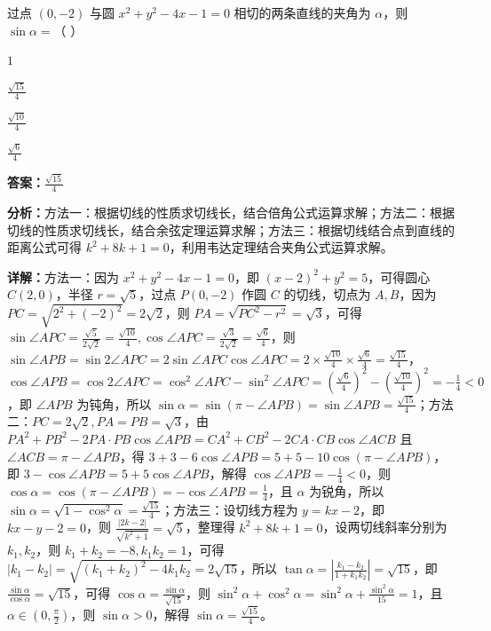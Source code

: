\begin{question}[points=5]
过点 $(0,-2)$ 与圆 $x^2+y^2-4x-1=0$ 相切的两条直线的夹角为 $\alpha$，则 $\sin\alpha=$（ ）
\begin{choices}
  \item $1$
  \item $\frac{\sqrt{15}}{4}$
  \item $\frac{\sqrt{10}}{4}$
  \item $\frac{\sqrt{6}}{4}$
\end{choices}
\begin{solution}
\textbf{答案：}$\frac{\sqrt{15}}{4}$

\textbf{分析：}方法一：根据切线的性质求切线长，结合倍角公式运算求解；方法二：根据切线的性质求切线长，结合余弦定理运算求解；方法三：根据切线结合点到直线的距离公式可得 $k^2+8k+1=0$，利用韦达定理结合夹角公式运算求解。

\textbf{详解：}方法一：因为 $x^2+y^2-4x-1=0$，即 $(x-2)^2+y^2=5$，可得圆心 $C(2,0)$，半径 $r=\sqrt{5}$，过点 $P(0,-2)$ 作圆 $C$ 的切线，切点为 $A,B$，因为 $PC=\sqrt{2^2+(-2)^2}=2\sqrt{2}$，则 $PA=\sqrt{PC^2-r^2}=\sqrt{3}$，可得 $\sin\angle APC=\frac{\sqrt{5}}{2\sqrt{2}}=\frac{\sqrt{10}}{4}, \cos\angle APC=\frac{\sqrt{3}}{2\sqrt{2}}=\frac{\sqrt{6}}{4}$，则 $\sin\angle APB=\sin 2\angle APC=2\sin\angle APC\cos\angle APC=2\times\frac{\sqrt{10}}{4}\times\frac{\sqrt{6}}{4}=\frac{\sqrt{15}}{4}$，$\cos\angle APB=\cos 2\angle APC=\cos^2\angle APC-\sin^2\angle APC=\left(\frac{\sqrt{6}}{4}\right)^2-\left(\frac{\sqrt{10}}{4}\right)^2=-\frac{1}{4}<0$，即 $\angle APB$ 为钝角，所以 $\sin\alpha=\sin(\pi-\angle APB)=\sin\angle APB=\frac{\sqrt{15}}{4}$；方法二：$PC=2\sqrt{2}, PA=PB=\sqrt{3}$，由 $PA^2+PB^2-2PA\cdot PB\cos\angle APB=CA^2+CB^2-2CA\cdot CB\cos\angle ACB$ 且 $\angle ACB=\pi-\angle APB$，得 $3+3-6\cos\angle APB=5+5-10\cos(\pi-\angle APB)$，即 $3-\cos\angle APB=5+5\cos\angle APB$，解得 $\cos\angle APB=-\frac{1}{4}<0$，则 $\cos\alpha=\cos(\pi-\angle APB)=-\cos\angle APB=\frac{1}{4}$，且 $\alpha$ 为锐角，所以 $\sin\alpha=\sqrt{1-\cos^2\alpha}=\frac{\sqrt{15}}{4}$；方法三：设切线方程为 $y=kx-2$，即 $kx-y-2=0$，则 $\frac{|2k-2|}{\sqrt{k^2+1}}=\sqrt{5}$，整理得 $k^2+8k+1=0$，设两切线斜率分别为 $k_1,k_2$，则 $k_1+k_2=-8, k_1k_2=1$，可得 $|k_1-k_2|=\sqrt{(k_1+k_2)^2-4k_1k_2}=2\sqrt{15}$，所以 $\tan\alpha=\left|\frac{k_1-k_2}{1+k_1k_2}\right|=\sqrt{15}$，即 $\frac{\sin\alpha}{\cos\alpha}=\sqrt{15}$，可得 $\cos\alpha=\frac{\sin\alpha}{\sqrt{15}}$，则 $\sin^2\alpha+\cos^2\alpha=\sin^2\alpha+\frac{\sin^2\alpha}{15}=1$，且 $\alpha\in(0,\frac{\pi}{2})$，则 $\sin\alpha>0$，解得 $\sin\alpha=\frac{\sqrt{15}}{4}$。
\end{solution}
\end{question}

